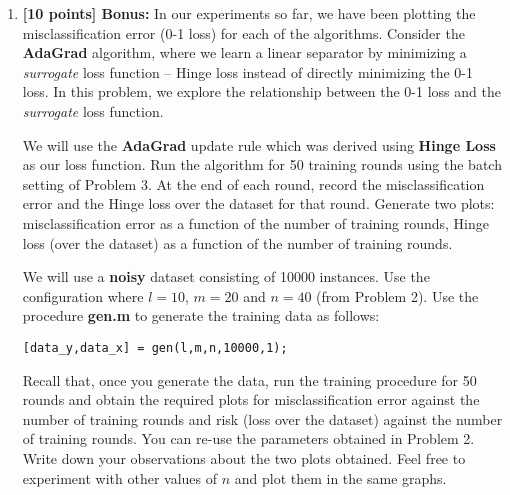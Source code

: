 \begin{enumerate}
\item {\bf [10 points] Bonus:} In our experiments so far, we have been plotting the  misclassification error (0-1 loss) for each of the algorithms. Consider the \textbf{AdaGrad} algorithm, where we learn a linear separator by minimizing a {\em surrogate} loss function -- Hinge loss instead of directly minimizing the 0-1 loss. 
In this problem, we explore the relationship between the 0-1 loss and the {\em surrogate} loss function. 

We will use the \textbf{AdaGrad} update rule which was derived using \textbf{Hinge Loss} as our loss function. Run the algorithm for 50 training rounds using the batch setting of Problem 3. At the end of each round, record the misclassification error and the Hinge loss over the dataset for that round. Generate two plots: misclassification error as a function of the number of training rounds, Hinge loss (over the dataset) as a function of the number of training rounds. 

We will use a \textbf{noisy} dataset consisting of 10000 instances. Use the configuration where $l = 10$, $m = 20$ and $n = 40$ (from Problem 2). Use the procedure \textbf{gen.m} to generate the training data as follows:

\begin{verbatim}
[data_y,data_x] = gen(l,m,n,10000,1);
\end{verbatim}

Recall that, once you generate the data, run the training procedure for 50 rounds and 
obtain the required plots for misclassification error against the number of training rounds and risk (loss over the dataset) against the number of training rounds. You can re-use the parameters obtained in Problem 2. Write down your observations about the two plots obtained. Feel free to experiment with other values of $n$ and plot them in the same graphs.
\end{enumerate}

\newpage
